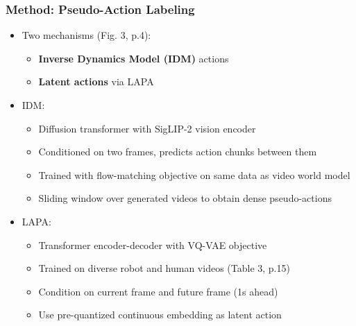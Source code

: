 \documentclass{beamer}
\begin{document}
\begin{frame}
  \frametitle{Method: Pseudo-Action Labeling}
  \small
  \begin{itemize}
    \item Two mechanisms (Fig. 3, p.4):
      \begin{itemize}
        \item \textbf{Inverse Dynamics Model (IDM)} actions
        \item \textbf{Latent actions} via LAPA
      \end{itemize}
    \item IDM:
      \begin{itemize}
        \item Diffusion transformer with SigLIP-2 vision encoder
        \item Conditioned on two frames, predicts action chunks between them
        \item Trained with flow-matching objective on same data as video world model
        \item Sliding window over generated videos to obtain dense pseudo-actions
      \end{itemize}
    \item LAPA:
      \begin{itemize}
        \item Transformer encoder-decoder with VQ-VAE objective
        \item Trained on diverse robot and human videos (Table 3, p.15)
        \item Condition on current frame and future frame (1s ahead)
        \item Use pre-quantized continuous embedding as latent action
      \end{itemize}
  \end{itemize}
\end{frame}
\end{document}
